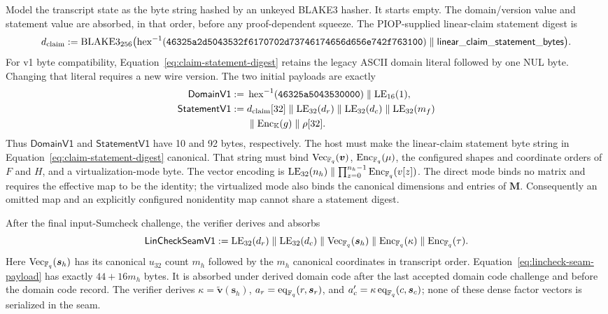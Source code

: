Model the transcript state as the byte string hashed by an unkeyed BLAKE3
hasher.  It starts empty.  The domain/version value  and statement
value  are absorbed, in that order, before any proof-dependent
squeeze.
The PIOP-supplied linear-claim statement digest is
\begin{equation}
 d_{\rm claim}:=\operatorname{BLAKE3}_{256}
 \bigl(\operatorname{hex}^{-1}
   (\texttt{46325a2d5043532f6170702d73746174656d656e742f763100})
 \parallel\mathsf{linear\_claim\_statement\_bytes}\bigr).
 \label{eq:claim-statement-digest}
\end{equation}
For v1 byte compatibility, Equation~\eqref{eq:claim-statement-digest} retains
the legacy ASCII domain literal  followed by one
NUL byte.  Changing that literal requires a new wire version.  The two initial
payloads are exactly
\begin{equation}
 \begin{aligned}
  \mathsf{DomainV1}:={}&
    \operatorname{hex}^{-1}(\texttt{46325a5043530000})
    \parallel\operatorname{LE}_{16}(1),\\
  \mathsf{StatementV1}:={}&
    d_{\rm claim}[32]
    \parallel\operatorname{LE}_{32}(d_r)\parallel\operatorname{LE}_{32}(d_c)\parallel\operatorname{LE}_{32}(m_f)\\
    &\parallel\operatorname{Enc}_{\mathbb K}(g)\parallel\rho[32].
 \end{aligned}
 \label{eq:domain-statement-payloads}
\end{equation}
Thus $\mathsf{DomainV1}$ and $\mathsf{StatementV1}$ have 10 and 92 bytes,
respectively.  The host must make the linear-claim statement byte
string in Equation~\eqref{eq:claim-statement-digest} canonical.  That string
must bind $\operatorname{Vec}_{\mathbb F_q}(\bm v)$, $\operatorname{Enc}_{\mathbb F_q}(\mu)$,
the configured shapes and coordinate orders of $F$ and $H$, and a
virtualization-mode byte.  The vector encoding is
$\operatorname{LE}_{32}(n_h)\parallel\prod_{z=0}^{n_h-1}
\operatorname{Enc}_{\mathbb F_q}(v[z])$.  The direct mode binds no matrix and requires
the effective map to be the identity; the virtualized mode also binds the
canonical dimensions and entries of $\bm M$.  Consequently an omitted map
and an explicitly configured nonidentity map cannot share a statement digest.

After the final input-Sumcheck challenge, the verifier derives and absorbs
\begin{equation}
 \mathsf{LinCheckSeamV1}:=
  \operatorname{LE}_{32}(d_r)\parallel\operatorname{LE}_{32}(d_c)\parallel
  \operatorname{Vec}_{\mathbb F_q}(\bm s_h)\parallel
  \operatorname{Enc}_{\mathbb F_q}(\kappa)\parallel
  \operatorname{Enc}_{\mathbb F_q}(\tau).
 \label{eq:lincheck-seam-payload}
\end{equation}
Here $\operatorname{Vec}_{\mathbb F_q}(\bm s_h)$ has its canonical $u_{32}$ count
$m_h$ followed by the $m_h$ canonical coordinates in transcript order.
Equation~\eqref{eq:lincheck-seam-payload} has exactly $44+16m_h$ bytes.  It is
absorbed under derived domain code  after the last accepted domain code 
challenge and before the domain code  record.  The verifier derives
$\kappa=\widetilde{\bm v}(\bm s_h)$,
$a_r=\operatorname{eq}_{\mathbb F_q}(r,\bm s_r)$, and
$a'_c=\kappa\operatorname{eq}_{\mathbb F_q}(c,\bm s_c)$; none of these dense factor vectors is
serialized in the seam.

